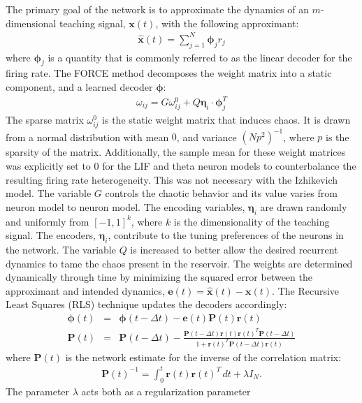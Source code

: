 \documentclass[11pt]{article} %
\begin{document}
 The primary goal of the network is to approximate the dynamics of an 
$m$-dimensional teaching signal, $\bm x(t)$, with the following approximant:
\begin{eqnarray}
\hat{\bm{x}}(t) = \sum_{j=1}^N \bm \phi_j r_j
\end{eqnarray}
where $\bm \phi_j$ is a quantity that is commonly referred to as the 
linear decoder for the firing rate.   
The FORCE method decomposes the weight matrix into a static component, 
and a learned decoder $ \bm{\phi}$:
\begin{eqnarray}
\omega_{ij} = G \omega^0_{ij} + Q \bm{\eta}_i \cdot \bm{\phi}_j  ^T
\end{eqnarray}
The sparse matrix $\omega_{ij}^0$ is the static weight matrix that induces chaos.  
It is drawn from a normal distribution with mean $0$, and variance $(Np^2)^{-1}$, 
where $p$ is the sparsity of the matrix.  Additionally, the sample mean for 
these weight matrices was explicitly set to $0$ for the LIF and theta neuron 
models to counterbalance the resulting firing rate heterogeneity.  
This was not necessary with the Izhikevich model.   
The variable $G$ controls the chaotic behavior and its value varies from 
neuron model to neuron model.   The encoding variables, $\bm \eta_i$ are 
drawn randomly and uniformly from $[-1,1]^k$, where $k$ is the dimensionality of 
the teaching signal.  The encoders, $\bm \eta_i$, contribute to the tuning 
preferences of the neurons in the network.  The variable $Q$ is increased 
to better allow the desired recurrent dynamics to tame the chaos present in the reservoir.    
The weights are determined dynamically through time by minimizing 
the squared error between the approximant and intended dynamics, 
$\bm{e}(t) = \hat{\bm{x}}(t) -\bm{x}(t)$.  
The Recursive Least Squares (RLS) technique updates the decoders accordingly:
\begin{eqnarray}
\bm{\phi}(t) &=& \bm{\phi}(t-\Delta t) - \bm{e}(t)\bm{P}(t)\bm{r}(t) \label{eq14} \\
\bm{P}(t) &=& \bm{P}(t-\Delta t) -\frac{ \bm{P}(t-\Delta t) \bm{r}(t)\bm{r}(t)^T \bm{P}(t-\Delta t)}{1 + \bm{r}(t)^T \bm{P}(t-\Delta t) \bm{r}(t)} \label{eq15}
\end{eqnarray} 
where $\bm{P}(t)$ is the network estimate for the inverse of the correlation matrix:
\begin{eqnarray}
\bm{P}(t)^{-1} = \int_{0}^t \bm r(t) \bm r(t)^T \,dt + \lambda I_N .
\end{eqnarray}
The parameter $\lambda$ acts both as a regularization parameter \cite{haykin} 
\end{document}
